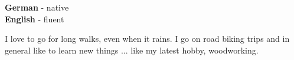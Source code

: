 \documentclass[9pt]{developercv} %
\begin{document}

\begin{minipage}[t]{0.3\textwidth}
	\vspace{-\baselineskip} %
	
	
	
	\textbf{German} - native\\
	\textbf{English} - fluent\\
\end{minipage}
\hfill
\begin{minipage}[t]{0.6\textwidth}
	\vspace{-\baselineskip} %
	
	
	I love to go for long walks, even when it rains. I go on road biking trips and in general like to learn new things ... like my latest hobby, woodworking.
\end{minipage}
\hfill
%	
%	

\end{document}
